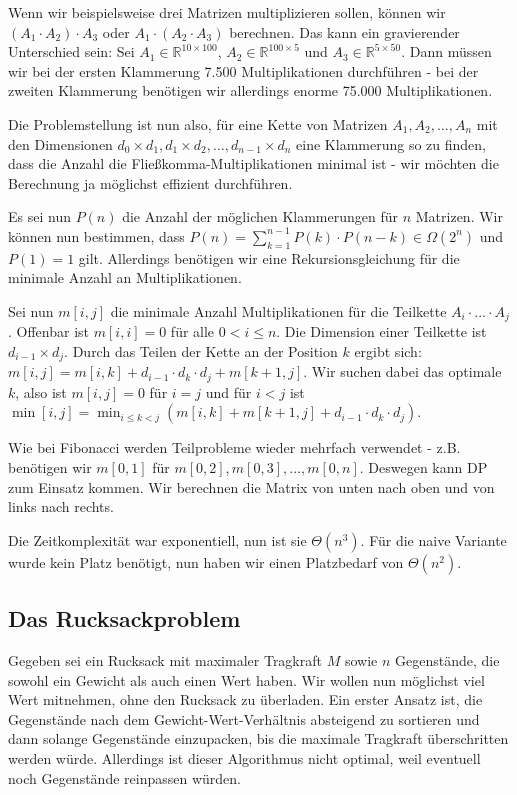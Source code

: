 \documentclass[12pt]{article}
\begin{document}
Wenn wir beispielsweise drei Matrizen multiplizieren sollen, können wir $(A_1 \cdot A_2) \cdot A_3$ oder $A_1 \cdot (A_2 \cdot A_3)$ berechnen. Das kann ein gravierender Unterschied sein: Sei $A_1 \in \mathbb{R}^{10 \times 100}$, $A_2 \in \mathbb{R}^{100 \times 5}$ und $A_3 \in \mathbb{R}^{5 \times 50}$. Dann müssen wir bei der ersten Klammerung 7.500 Multiplikationen durchführen - bei der zweiten Klammerung benötigen wir allerdings enorme 75.000 Multiplikationen.

Die Problemstellung ist nun also, für eine Kette von Matrizen $A_1, A_2, ..., A_n$ mit den Dimensionen $d_0 \times d_1, d_1 \times d_2, ..., d_{n-1} \times d_n$ eine Klammerung so zu finden, dass die Anzahl die Fließkomma-Multiplikationen minimal ist - wir möchten die Berechnung ja möglichst effizient durchführen.

Es sei nun $P(n)$ die Anzahl der möglichen Klammerungen für $n$ Matrizen. Wir können nun bestimmen, dass $P(n) = \sum_{k = 1}^{n - 1} P(k) \cdot P(n-k) \in \Omega(2^n)$ und $P(1) = 1$ gilt. Allerdings benötigen wir eine Rekursionsgleichung für die minimale Anzahl an Multiplikationen.

Sei nun $m[i,j]$ die minimale Anzahl Multiplikationen für die Teilkette $A_i \cdot ... \cdot A_j$. Offenbar ist $m[i,i] = 0$ für alle $0 < i \leq n$. Die Dimension einer Teilkette ist $d_{i-1} \times d_j$. Durch das Teilen der Kette an der Position $k$ ergibt sich: $m[i,j] = m[i,k] + d_{i-1} \cdot d_k \cdot d_j + m[k+1,j]$. Wir suchen dabei das optimale $k$, also ist $m[i,j] = 0$ für $i = j$ und für $i<j$ ist $\min[i,j]=\min_{i \leq k < j}(m[i,k]+m[k+1,j]+d_{i-1} \cdot d_k \cdot d_j)$.

Wie bei Fibonacci werden Teilprobleme wieder mehrfach verwendet - z.B. benötigen wir $m[0,1]$ für $m[0,2], m[0,3], ..., m[0,n]$. Deswegen kann DP zum Einsatz kommen. Wir berechnen die Matrix von unten nach oben und von links nach rechts.

Die Zeitkomplexität war exponentiell, nun ist sie $\Theta(n^3)$. Für die naive Variante wurde kein Platz benötigt, nun haben wir einen Platzbedarf von $\Theta(n^2)$.

\subsection{Das Rucksackproblem}

Gegeben sei ein Rucksack mit maximaler Tragkraft $M$ sowie $n$ Gegenstände, die sowohl ein Gewicht als auch einen Wert haben. Wir wollen nun möglichst viel Wert mitnehmen, ohne den Rucksack zu überladen. Ein erster Ansatz ist, die Gegenstände nach dem Gewicht-Wert-Verhältnis absteigend zu sortieren und dann solange Gegenstände einzupacken, bis die maximale Tragkraft überschritten werden würde. Allerdings ist dieser Algorithmus nicht optimal, weil eventuell noch Gegenstände reinpassen würden.
\end{document}
